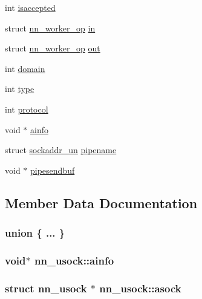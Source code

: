 \begin{DoxyCompactItemize}
\begin{tabbing}
\end{tabbing}\item 
int \hyperlink{structnn__usock_a6a82c1b670fd6515b421311a3fb52029}{isaccepted}
\item 
struct \hyperlink{structnn__worker__op}{nn\+\_\+worker\+\_\+op} \hyperlink{structnn__usock_aa038b159741f4e987d814f76b0a4df18}{in}
\item 
struct \hyperlink{structnn__worker__op}{nn\+\_\+worker\+\_\+op} \hyperlink{structnn__usock_ad3e30db9d5d87d8b071d7acf7383ce29}{out}
\item 
int \hyperlink{structnn__usock_a57a6a3c319ded299444dbbe75fbdc383}{domain}
\item 
int \hyperlink{structnn__usock_ac2de5c69882ca0041b210aaf57cdcebd}{type}
\item 
int \hyperlink{structnn__usock_a5d16683f021c46c67ed9687b11768df4}{protocol}
\item 
void $\ast$ \hyperlink{structnn__usock_a9b94e4c40ad43fe8a8fa0bcaa336cf75}{ainfo}
\item 
struct \hyperlink{structsockaddr__un}{sockaddr\+\_\+un} \hyperlink{structnn__usock_afaad9f5a27960aee76a305cbae8a47bd}{pipename}
\item 
void $\ast$ \hyperlink{structnn__usock_aa2c6e4b935c29acc433e55ce574965b3}{pipesendbuf}
\end{DoxyCompactItemize}


\subsection{Member Data Documentation}
\subsubsection[{"@3}]{\setlength{\rightskip}{0pt plus 5cm}union \{ ... \} }\hypertarget{structnn__usock_aaca6dabdb4bba0daf4e62e7c6777756f}{}\label{structnn__usock_aaca6dabdb4bba0daf4e62e7c6777756f}
\subsubsection[{ainfo}]{\setlength{\rightskip}{0pt plus 5cm}void$\ast$ nn\+\_\+usock\+::ainfo}\hypertarget{structnn__usock_a9b94e4c40ad43fe8a8fa0bcaa336cf75}{}\label{structnn__usock_a9b94e4c40ad43fe8a8fa0bcaa336cf75}
\subsubsection[{asock}]{\setlength{\rightskip}{0pt plus 5cm}struct {\bf nn\+\_\+usock} $\ast$ nn\+\_\+usock\+::asock}\hypertarget{structnn__usock_ac14b365a5a0e446a5d3f0ae2a7e7a642}{}\label{structnn__usock_ac14b365a5a0e446a5d3f0ae2a7e7a642}
